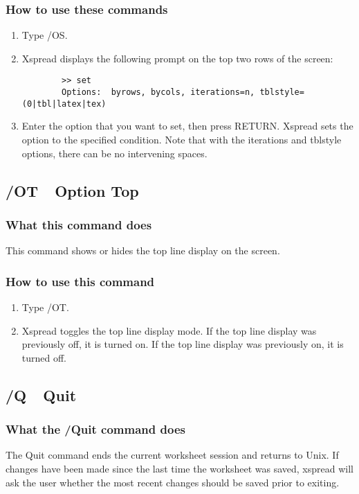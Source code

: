 \subsubsection*{How to use these commands}
\begin{enumerate}
\item{Type /OS.}
\item{Xspread displays the following prompt on the top two rows of the
        screen:\\
        \begin{verbatim}
        >> set 
        Options:  byrows, bycols, iterations=n, tblstyle=(0|tbl|latex|tex)
        \end{verbatim} }
\item{Enter the option that you want to set, then press RETURN.  Xspread
        sets the option to the specified condition.  Note that with the
        iterations and tblstyle options, there can be no intervening
        spaces.}
\end{enumerate}
        
\subsection*{/OT\ \      Option Top}

\subsubsection*{What this command does}
This command shows or hides the top line display on the screen.

\subsubsection*{How to use this command}
\begin{enumerate}
\item{Type /OT.}
\item{Xspread toggles the top line display mode.  If the top line
        display was previously off, it is turned on.  If the top line
        display was previously on, it is turned off.}
\end{enumerate}
        
\subsection*{/Q\ \       Quit}

\subsubsection*{What the /Quit command does}
The Quit command ends the current worksheet session and returns to 
Unix.  If changes have been made since the last time the worksheet was 
saved, xspread will ask the user whether the most recent changes 
should be saved prior to exiting.

